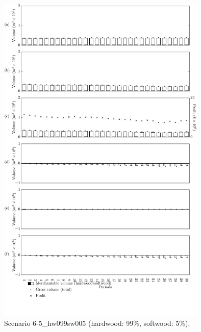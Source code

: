 \begin{figure}[h]
  \centering
  \includegraphics[width=10cm]{images/appendix/s6-5_hw099sw005}
  \caption{Scenario 6-5\_hw099sw005 (hardwood: 99\%, softwood: 5\%).}
  \label{fig:s6-5_hw099sw005}
\end{figure}

